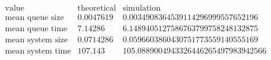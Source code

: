 \[\begin{array}{cccc}
 \text{value} & \text{theoretical} & \text{simulation} & \text{} \\
 \text{mean queue size} & 0.0047619 & 0.0034908364539114296999557652196 & \text{} \\
 \text{mean queue time} & 7.14286 & 6.1489405127586763799758248132875 & \text{} \\
 \text{mean system size} & 0.0714286 & 0.0596603860430751773559140555169 & \text{} \\
 \text{mean system time} & 107.143 & 105.0889004943326446265497983942566 & \text{} \\
\end{array}\]

